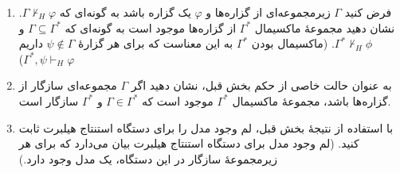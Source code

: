 \begin{enumerate}[label=(\alph*)]
    \item فرض کنید $\Gamma$ زیرمجموعه‌ای از گزاره‌ها و $\varphi$ یک گزاره باشد به گونه‌ای که $\Gamma \not\vdash_H \varphi$. نشان دهید مجموعهٔ ماکسیمال $\Gamma^*$ از گزاره‌ها موجود است به گونه‌ای که $\Gamma \subseteq \Gamma^*$ و $\Gamma^* \not\vdash_H \phi$. (ماکسیمال بودن $\Gamma^*$ به این معناست که برای هر گزارهٔ $\psi \not\in \Gamma$ داریم $\Gamma^*,\psi \vdash_H \varphi$)
    \item به عنوان حالت خاصی از حکم بخش قبل، نشان دهید اگر $\Gamma$ مجموعه‌ای سازگار از گزاره‌ها باشد، مجموعهٔ ماکسیمال $\Gamma^*$ موجود است که $\Gamma \in \Gamma^*$ و $\Gamma^*$ سازگار است.
    \item با استفاده از نتیجهٔ بخش قبل، لم وجود مدل را برای دستگاه استنتاج هیلبرت ثابت کنید. (لم وجود مدل برای دستگاه استنتاج هیلبرت بیان می‌دارد که برای هر زیرمجموعهٔ سازگار در این دستگاه، یک مدل وجود دارد.)
\end{enumerate}
